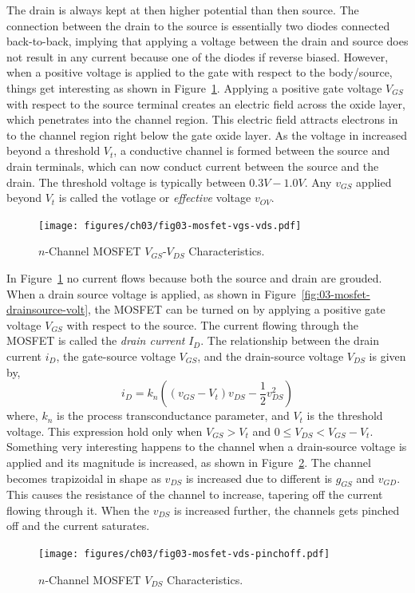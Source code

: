 The drain is always kept at then higher potential than then source. The connection between the drain to the source is essentially two diodes connected back-to-back, implying that applying a voltage between the drain and source does not result in any current because one of the diodes if reverse biased. However, when a positive voltage is applied to the gate with respect to the body/source, things get interesting as shown in Figure~\ref{fig:03-mosfet-gate-volt}. Applying a positive gate voltage $V_{GS}$ with respect to the source terminal creates an electric field across the oxide layer, which penetrates into the channel region. This electric field attracts electrons in to the channel region right below the gate oxide layer. As the voltage in increased beyond a threshold $V_t$, a conductive channel is formed between the source and drain terminals, which can now conduct current between the source and the drain. The threshold voltage is typically between $0.3V-1.0V$. Any $v_{GS}$ applied beyond $V_t$ is called the  votlage or \textit{effective} voltage $v_{OV}$.

\begin{figure}[t]
    \centering
    \texttt{[image: figures/ch03/fig03-mosfet-vgs-vds.pdf]}
    \caption{$n$-Channel MOSFET $V_{GS}$-$V_{DS}$ Characteristics.}
    \label{fig:03-mosfet-gate-volt}
\end{figure}

In Figure~\ref{fig:03-mosfet-gate-volt} no current flows because both the source and drain are grouded. When a drain source voltage is applied, as shown in Figure~\ref{fig:03-mosfet-drainsource-volt}, the MOSFET can be turned on by applying a positive gate voltage $V_{GS}$ with respect to the source. The current flowing through the MOSFET is called the \textit{drain current} $I_D$. The relationship between the drain current $i_D$, the gate-source voltage $V_{GS}$, and the drain-source voltage $V_{DS}$ is given by,
\begin{equation}
    i_D = k_n\left(\left(v_{GS} - V_t\right)v_{DS} - \frac{1}{2}v_{DS}^2\right)
    \label{eq03-mosfet-id-vgs}
\end{equation}
where, $k_n$ is the process transconductance parameter, and $V_t$ is the threshold voltage. This expression hold only when $V_{GS} > V_t$ and $0 \leq V_{DS} < V_{GS} - V_t$. Something very interesting happens to the channel when a drain-source voltage is applied and its magnitude is increased, as shown in Figure~\ref{fig:03-mosfet-vds-pinchoff}. The channel becomes trapizoidal in shape as $v_{DS}$ is increased due to different is $g_{GS}$ and $v_{GD}$. This causes the resistance of the channel to increase, tapering off the current flowing through it. When the $v_{DS}$ is increased further, the channels gets pinched off and the current saturates.
\begin{figure}[b]
    \centering
    \texttt{[image: figures/ch03/fig03-mosfet-vds-pinchoff.pdf]}
    \caption{$n$-Channel MOSFET $V_{DS}$ Characteristics.}
    \label{fig:03-mosfet-vds-pinchoff}
\end{figure}

